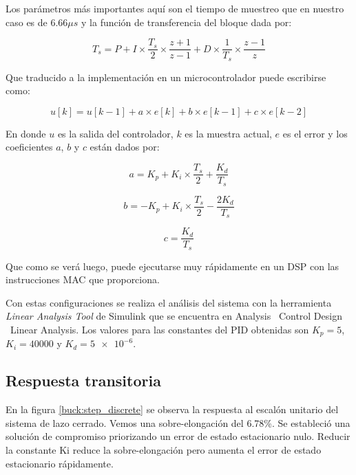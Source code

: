 \documentclass[12pt]{report}
\begin{document}
	Los parámetros más importantes aquí son el tiempo de muestreo que en nuestro caso es de $6.66 \mu s$ y la función de transferencia del bloque dada por:
	
	\begin{equation}
		T_s = P + I \times \frac{T_s}{2} \times \frac{z+1}{z-1} + D \times \frac{1}{T_s} \times \frac{z-1}{z}
		\label{pid:algorithm}
	\end{equation}
	
	Que traducido a la implementación en un microcontrolador puede escribirse como:
	
	\begin{equation}
		u[k] = u[k-1] + a \times e[k] + b \times e[k-1] + c \times e[k-2]
	\end{equation}
	
	En donde $u$ es la salida del controlador, $k$ es la muestra actual, $e$ es el error y los coeficientes $a$, $b$ y $c$ están dados por:
	
	\begin{equation}
		a = K_p + K_i \times \frac{T_s}{2} + \frac{K_d}{T_s}
	\end{equation}
	
	\begin{equation}
		b = -K_p + K_i \times \frac{T_s}{2} - \frac{2K_d}{T_s}
	\end{equation}
	
	\begin{equation}
		c = \frac{K_d}{T_s}
	\end{equation}
	
	Que como se verá luego, puede ejecutarse muy rápidamente en un DSP con las instrucciones MAC que proporciona.
	
	Con estas configuraciones se realiza el análisis del sistema con la herramienta \textit{Linear Analysis Tool} de Simulink que se encuentra en Analysis \textrightarrow \ Control Design \textrightarrow \ Linear Analysis. Los valores para las constantes del PID obtenidas son $K_p = 5$, $K_i = 40000$ y $K_d = \num{5e-6}$.
	
	\subsection{Respuesta transitoria}
	
	En la figura \ref{buck:step_discrete} se observa la respuesta al escalón unitario del sistema de lazo cerrado. Vemos una sobre-elongación del 6.78\%. Se estableció una solución de compromiso priorizando un error de estado estacionario nulo. Reducir la constante Ki reduce la sobre-elongación pero aumenta el error de estado estacionario rápidamente.
	
\end{document}
